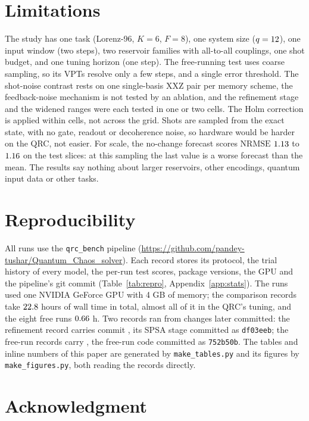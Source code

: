 \documentclass[11pt,a4paper]{article}
\newcommand{\nrmse}{\mathrm{NRMSE}}
\begin{document}
\section{Limitations}
\label{sec:limits}

The study has one task (Lorenz-96, $K=6$, $F=8$), one system size ($q=12$), one input window
(two steps), two reservoir families with all-to-all couplings, one shot budget, and one tuning
horizon (one step). The free-running test uses coarse sampling, so its VPTs resolve only a few
steps, and a single error threshold. The shot-noise contrast rests on one single-basis XXZ pair per
memory scheme, the feedback-noise mechanism is not tested by an ablation, and the refinement stage
and the widened ranges were each tested in one or two cells. The Holm correction is applied within
cells, not across the grid. Shots are sampled from the exact state, with no gate, readout or
decoherence noise, so hardware would be harder on the QRC, not easier. For scale, the no-change
forecast scores $\nrmse$ $1.13$ to $1.16$ on the test slices: at this sampling the last value
is a worse forecast than the mean. The results say nothing about larger reservoirs, other encodings,
quantum input data or other tasks.

\section{Reproducibility}
\label{sec:repro}

All runs use the \texttt{qrc\_bench} pipeline
(\url{https://github.com/pandey-tushar/Quantum_Chaos_solver}). Each record stores its protocol, the
trial history of every model, the per-run test scores, package versions, the GPU and the pipeline's
git commit (Table~\ref{tab:repro}, Appendix~\ref{app:stats}). The runs used one NVIDIA GeForce
\gpu{} GPU with 4 GB of memory; the comparison records take $22.8$ hours of wall time in
total, almost all of it in the QRC's tuning, and the eight free runs $0.66$ h. Two records
ran from changes later committed: the refinement record carries commit \texttt{}, its
SPSA stage committed as \texttt{df03eeb}; the free-run records carry \texttt{\freerunCommit}, the
free-run code committed as \texttt{752b50b}. The tables and inline numbers of this paper are
generated by \texttt{make\_tables.py} and its figures by \texttt{make\_figures.py}, both reading the
records directly.

\section*{Acknowledgment}
\end{document}

